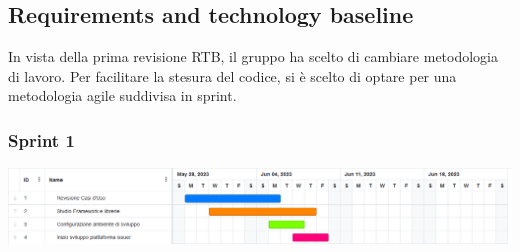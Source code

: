 \subsection{Requirements and technology baseline}
In vista della prima revisione RTB, il gruppo ha scelto di cambiare metodologia di lavoro. Per facilitare la stesura del codice, si è scelto di optare per una metodologia agile suddivisa in sprint.


\subsubsection{Sprint 1}
\begin{center}
    \includegraphics[scale = 0.4]{./res/img/Sprint_1.png}
  \end{center}


